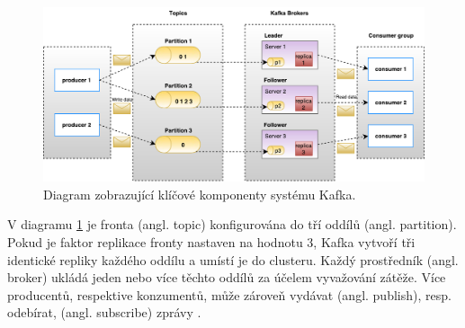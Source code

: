 \begin{figure}[!h]
  \centering
  \includegraphics[width=15cm]{template-fig/Kafka_architecture.pdf}
  \caption{Diagram zobrazující klíčové komponenty systému Kafka. \cite{kafkaTutorialsPoint}}
  \label{FIG_KafkaArchitecture}
\end{figure}

\noindent V diagramu \ref{FIG_KafkaArchitecture} je fronta (angl. topic) konfigurována do tří oddílů (angl. partition). Pokud je faktor replikace fronty nastaven na hodnotu 3, Kafka vytvoří tři identické repliky každého oddílu a umístí je do clusteru. Každý prostředník (angl. broker) ukládá jeden nebo více těchto oddílů za účelem vyvažování zátěže. Více producentů, respektive konzumentů, může zároveň vydávat (angl. publish), resp. odebírat, (angl. subscribe) zprávy \cite{kafkaTutorialsPoint}.

